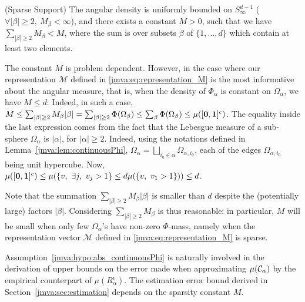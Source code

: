 \begin{assumption}\label{jmva:hypo:abs_continuousPhi}({\sc Sparse Support})
  The angular density is uniformly bounded on $S^{d-1}_\infty$ ($\forall |\beta| \ge 2,~M_\beta < \infty$), and there exists a constant  $M>0$, such that we have $\sum_{|\beta| \ge 2} M_\beta < M$, where the sum is over subsets $\beta$ of $\{1,\ldots,d\}$ which contain at least two elements.
\end{assumption}

\begin{remark}
The constant $M$ is problem dependent. However, in the case where our representation $\mathcal{M}$ defined in \eqref{jmva:eq:representation_M} is the most informative about the angular measure, that is, when the density of $\Phi_\alpha$ is constant on $\Omega_\alpha$, we have $M \le d$: Indeed, in such a case, 
$M \le \sum_{|\beta| \ge 2} M_\beta |\beta| = \sum_{|\beta| \ge 2} \Phi(\Omega_\beta) \le \sum_\beta \Phi(\Omega_\beta) \le \mu([\mathbf 0,\mathbf 1]^c)$.
The equality inside the last expression comes from the fact that the Lebesgue measure of a sub-sphere $\Omega_\alpha$ is $|\alpha|$, for $|\alpha| \ge 2$. Indeed, using the notations defined in Lemma~\ref{jmva:lem:continuousPhi}, $\Omega_\alpha = \bigsqcup_{i_0 \in \alpha}\Omega_{\alpha,i_0}$, each of the edges $\Omega_{\alpha,i_0}$ being unit hypercube. %
Now, $\mu([\mathbf 0,\mathbf 1]^c) \le \mu(\{v,~ \exists j,~ v_j > 1\} \le d \mu(\{v,~v_1 >1\})) \le d$.

\noindent
Note that the summation $\sum_{|\beta| \ge 2} M_\beta |\beta|$ is smaller than $d$ despite the (potentially large) factors $|\beta|$. Considering $\sum_{|\beta| \ge 2} M_\beta$ is thus reasonable: in particular, $M$ will be small when only few $\Omega_\alpha$'s have non-zero $\Phi$-mass, namely when the representation vector $\mathcal{M}$ defined in \eqref{jmva:eq:representation_M} is sparse.
\end{remark}
\noindent Assumption~\ref{jmva:hypo:abs_continuousPhi} is naturally involved in the derivation of upper bounds on the error made when approximating $\mu(\mathcal{C}_\alpha)$ by the empirical counterpart of $\mu(R_\alpha^\epsilon)$.
The estimation error bound derived in Section~\ref{jmva:sec:estimation} depends on the sparsity constant $M$.

